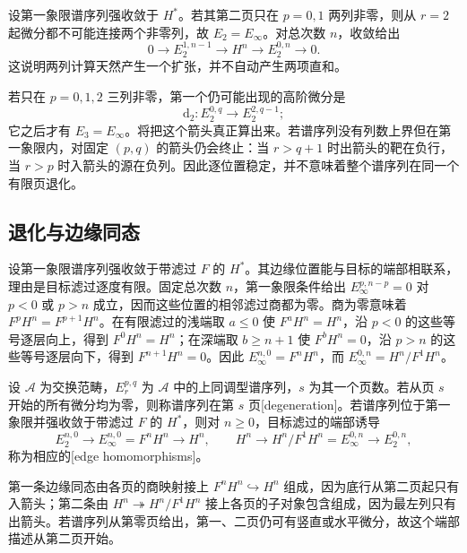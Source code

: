 设第一象限谱序列强收敛于 \(H^*\)。若其第二页只在 \(p=0,1\) 两列非零，则从 \(r=2\) 起微分都不可能连接两个非零列，故 \(E_2=E_\infty\)。对总次数 \(n\)，收敛给出
\[
	0\longrightarrow E_2^{1,n-1}\longrightarrow H^n \longrightarrow E_2^{0,n}\longrightarrow0.
\]
这说明两列计算天然产生一个扩张，并不自动产生两项直和。

\ProseParagraphBreak
若只在 \(p=0,1,2\) 三列非零，第一个仍可能出现的高阶微分是
\[
	\mathrm{d}_2:E_2^{0,q}\longrightarrow E_2^{2,q-1};
\]
它之后才有 \(E_3=E_\infty\)。将把这个箭头真正算出来。若谱序列没有列数上界但在第一象限内，对固定 \((p,q)\) 的箭头仍会终止：当 \(r>q+1\) 时出箭头的靶在负行，当 \(r>p\) 时入箭头的源在负列。因此逐位置稳定，并不意味着整个谱序列在同一个有限页退化。

\subsection{退化与边缘同态}
\label{b4:subsec:1404:03}

设第一象限谱序列强收敛于带滤过 \(F\) 的 \(H^*\)。其边缘位置能与目标的端部相联系，理由是目标滤过逐度有限。固定总次数 \(n\)，第一象限条件给出 \(E_\infty^{p,n-p}=0\) 对 \(p<0\) 或 \(p>n\) 成立，因而这些位置的相邻滤过商都为零。商为零意味着 \(F^pH^n=F^{p+1}H^n\)。在有限滤过的浅端取 \(a\le0\) 使 \(F^aH^n=H^n\)，沿 \(p<0\) 的这些等号逐层向上，得到 \(F^0H^n=H^n\)；在深端取 \(b\ge n+1\) 使 \(F^bH^n=0\)，沿 \(p>n\) 的这些等号逐层向下，得到 \(F^{n+1}H^n=0\)。因此 \(E_\infty^{n,0}=F^nH^n\)，而 \(E_\infty^{0,n}=H^n/F^1H^n\)。

\begin{definition}\label{b4:def:spectral-degeneration}
	设 \(\mathcal A\) 为交换范畴，\(E_r^{p,q}\) 为 \(\mathcal A\) 中的上同调型谱序列，\(s\) 为其一个页数。若从页 \(s\) 开始的所有微分均为零，则称谱序列在第 \(s\) 页[degeneration]。若谱序列位于第一象限并强收敛于带滤过 \(F\) 的 \(H^*\)，则对 \(n\ge0\)，目标滤过的端部诱导
	\[
		E_2^{n,0}\longrightarrow E_\infty^{n,0}=F^nH^n\longrightarrow H^n, \qquad H^n\longrightarrow H^n/F^1H^n=E_\infty^{0,n}\longrightarrow E_2^{0,n},
	\]
	称为相应的[edge homomorphisms]。
\end{definition}

第一条边缘同态由各页的商映射接上 \(F^nH^n\hookrightarrow H^n\) 组成，因为底行从第二页起只有入箭头；第二条由 \(H^n\twoheadrightarrow H^n/F^1H^n\) 接上各页的子对象包含组成，因为最左列只有出箭头。若谱序列从第零页给出，第一、二页仍可有竖直或水平微分，故这个端部描述从第二页开始。

